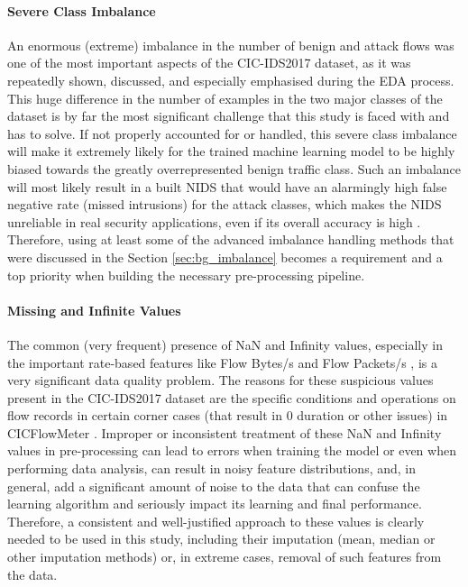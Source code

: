 \paragraph{Severe Class Imbalance} 
An enormous (extreme) imbalance in the number of benign and attack flows was one of the most important aspects of the CIC-IDS2017 dataset, as it was repeatedly shown, discussed, and especially emphasised during the EDA process. This huge difference in the number of examples in the two major classes of the dataset is by far the most significant challenge that this study is faced with and has to solve. If not properly accounted for or handled, this severe class imbalance will make it extremely likely for the trained machine learning model to be highly biased towards the greatly overrepresented benign traffic class. Such an imbalance will most likely result in a built NIDS that would have an alarmingly high false negative rate (missed intrusions) for the attack classes, which makes the NIDS unreliable in real security applications, even if its overall accuracy is high \parencite{mahfouz2022systematic}. Therefore, using at least some of the advanced imbalance handling methods that were discussed in the Section \ref{sec:bg_imbalance} becomes a requirement and a top priority when building the necessary pre-processing pipeline.

\paragraph{Missing and Infinite Values} 
The common (very frequent) presence of NaN and Infinity values, especially in the important rate-based features like Flow Bytes/s and Flow Packets/s , is a very significant data quality problem. The reasons for these suspicious values present in the CIC-IDS2017 dataset are the specific conditions and operations on flow records in certain corner cases (that result in 0 duration or other issues) in CICFlowMeter \parencite{sharafaldin2018toward}. Improper or inconsistent treatment of these NaN and Infinity values in pre-processing can lead to errors when training the model or even when performing data analysis, can result in noisy feature distributions, and, in general, add a significant amount of noise to the data that can confuse the learning algorithm and seriously impact its learning and final performance. Therefore, a consistent and well-justified approach to these values is clearly needed to be used in this study, including their imputation (mean, median or other imputation methods) or, in extreme cases, removal of such features from the data.

